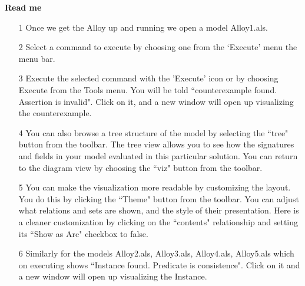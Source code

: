 \documentclass[a4paper,10pt]{article}
\begin{document}
\begin{center}
\textbf{Read me}
\end{center}
\begin{itemize}
\item[1]Once we get the Alloy up and running we open a model Alloy1.als.
\item[2]Select a command to execute by choosing one from the `Execute' menu the menu bar.
\item[3]Execute the selected command with the 'Execute' icon or by choosing Execute from the Tools menu. You will be told ``counterexample found. Assertion is invalid". Click on it, and a new window will open up visualizing the counterexample.
\item[4]You can also browse a tree structure of the model by selecting the ``tree" button from the toolbar. The tree view allows you to see how the signatures and fields in your model evaluated in this particular solution. You can return to the diagram view by choosing the ``viz" button from the toolbar.
\item[5]You can make the visualization more readable by customizing the layout. You do this by clicking the ``Theme" button from the toolbar. You can adjust what relations and sets are shown, and the style of their presentation. Here is a cleaner customization by clicking on the ``contents" relationship and setting its ``Show as Arc" checkbox to false.
\item[6]Similarly for the models Alloy2.als, Alloy3.als, Alloy4.als, Alloy5.als which on executing shows ``Instance found. Predicate is consistence". Click on it and a new window will open up visualizing the Instance.
\end{itemize}
\end{document}
